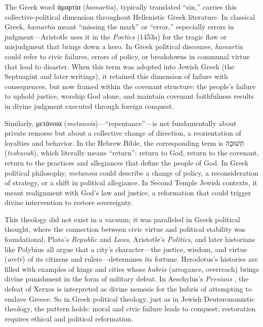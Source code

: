 The Greek word ἁμαρτία (\textit{hamartia}), typically translated ``sin,'' carries this collective-political dimension throughout Hellenistic Greek literature.
In classical Greek, \textit{hamartia} meant ``missing the mark'' or ``error,'' especially errors in judgment---Aristotle uses it in the \textit{Poetics} (1453a) \cite[1453a]{aristotle:poetics} for the tragic flaw or misjudgment that brings down a hero.
In Greek political discourse, \textit{hamartia} could refer to civic failures, errors of policy, or breakdowns in communal virtue that lead to disaster.
When this term was adopted into Jewish Greek (the Septuagint and later writings), it retained this dimension of failure with consequences, but now framed within the covenant structure: the people's failure to uphold justice, worship God alone, and maintain covenant faithfulness results in divine judgment executed through foreign conquest.

Similarly, μετάνοια (\textit{metanoia})---``repentance''---is not fundamentally about private remorse but about a collective change of direction, a reorientation of loyalties and behavior.
In the Hebrew Bible, the corresponding term is \texthebrew{תְּשׁוּבָה} (\textit{teshuvah}), which literally means ``return'':
return to God, return to the covenant, return to the practices and allegiances that define the people of God.
In Greek political philosophy, \textit{metanoia} could describe a change of policy, a reconsideration of strategy, or a shift in political allegiance.
In Second Temple Jewish contexts, it meant realignment with God's law and justice, a reformation that could trigger divine intervention to restore sovereignty.

This theology did not exist in a vacuum; it was paralleled in Greek political thought, where the connection between civic virtue and political stability was foundational.
Plato's \textit{Republic} and \textit{Laws}, Aristotle's \textit{Politics}, and later historians like Polybius \cite{polybius:histories} all argue that a city's character---the justice, wisdom, and virtue (\textit{aretē}) of its citizens and rulers---determines its fortune.
Herodotus's histories are filled with examples of kings and cities whose \textit{hubris} (arrogance, overreach) brings divine punishment in the form of military defeat.
In Aeschylus's \textit{Persians} \cite{aeschylus:persians}, the defeat of Xerxes is interpreted as divine nemesis for the hubris of attempting to enslave Greece.
So in Greek political theology, just as in Jewish Deuteronomistic theology, the pattern holds: moral and civic failure leads to conquest; restoration requires ethical and political reformation.

